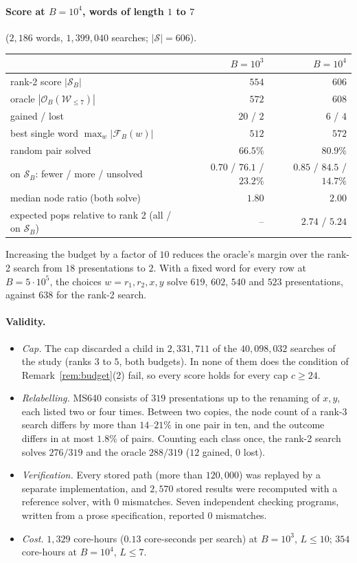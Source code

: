 \documentclass[11pt]{article}
\theoremstyle{definition}
\theoremstyle{remark}
\newcommand{\Sol}{\mathcal{S}}
\newcommand{\Orc}{\mathcal{O}}
\newcommand{\Fix}{\mathcal{F}}
\newcommand{\W}{\mathcal{W}}
\begin{document}
\paragraph{Score at $B=10^4$, words of length $1$ to $7$} ($2{,}186$ words, $1{,}399{,}040$ searches;
$|\Sol|=606$).
\begin{center}
\begin{tabular}{lrr}
\toprule
& $B=10^3$ & $B=10^4$\\
\midrule
rank-2 score $|\Sol_B|$ & $554$ & $606$\\
oracle $|\Orc_B(\W_{\le7})|$ & $572$ & $608$\\
gained / lost & $20$ / $2$ & $6$ / $4$\\
best single word $\max_w|\Fix_B(w)|$ & $512$ & $572$\\
random pair solved & $66.5\%$ & $80.9\%$\\
on $\Sol_B$: fewer / more / unsolved & $0.70$ / $76.1$ / $23.2\%$ & $0.85$ / $84.5$ / $14.7\%$\\
median node ratio (both solve) & $1.80$ & $2.00$\\
expected pops relative to rank 2 (all / on $\Sol_B$) & -- & $2.74$ / $5.24$\\
\bottomrule
\end{tabular}
\end{center}
Increasing the budget by a factor of $10$ reduces the oracle's margin over the rank-2 search from $18$ presentations to
$2$. With a fixed word for every row at $B=5\cdot10^5$, the choices $w=r_1,r_2,x,y$ solve $619$, $602$, $540$ and $523$
presentations, against $638$ for the rank-2 search.

\paragraph{Validity.}
\begin{itemize}
  \item \emph{Cap.} The cap discarded a child in $2{,}331{,}711$ of the $40{,}098{,}032$ searches of the study (ranks $3$
  to $5$, both budgets). In none of them does the condition of Remark~\ref{rem:budget}(2) fail, so every score holds
  for every cap $c\ge24$.
  \item \emph{Relabelling.} MS640 consists of $319$ presentations up to the renaming of $x,y$, each listed two or four
  times. Between two copies, the node count of a rank-3 search differs by more than $14$--$21\%$ in one pair in ten, and
  the outcome differs in at most $1.8\%$ of pairs. Counting each class once, the rank-2 search solves $276/319$ and the
  oracle $288/319$ ($12$ gained, $0$ lost).
  \item \emph{Verification.} Every stored path (more than $120{,}000$) was replayed by a separate implementation, and
  $2{,}570$ stored results were recomputed with a reference solver, with $0$ mismatches. Seven independent checking
  programs, written from a prose specification, reported $0$ mismatches.
  \item \emph{Cost.} $1{,}329$ core-hours ($0.13$ core-seconds per search) at $B=10^3$, $L\le10$; $354$ core-hours at
  $B=10^4$, $L\le7$.
\end{itemize}
\end{document}
